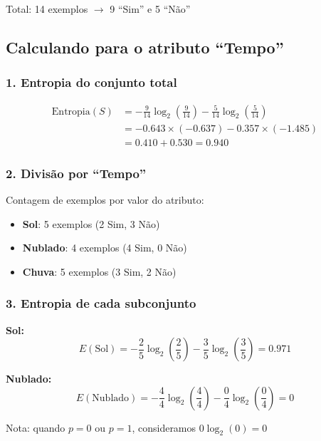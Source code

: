 \documentclass[12pt,a4paper]{article}
\begin{document}
Total: 14 exemplos $\rightarrow$ 9 ``Sim'' e 5 ``Não''

\subsection{Calculando para o atributo ``Tempo''}

\subsubsection{1. Entropia do conjunto total}

\begin{align}
\text{Entropia}(S) &= -\frac{9}{14}\log_2\left(\frac{9}{14}\right) - \frac{5}{14}\log_2\left(\frac{5}{14}\right) \\
&= -0.643 \times (-0.637) - 0.357 \times (-1.485) \\
&= 0.410 + 0.530 = 0.940
\end{align}

\subsubsection{2. Divisão por ``Tempo''}

Contagem de exemplos por valor do atributo:
\begin{itemize}
    \item \textbf{Sol}: 5 exemplos (2 Sim, 3 Não)
    \item \textbf{Nublado}: 4 exemplos (4 Sim, 0 Não)
    \item \textbf{Chuva}: 5 exemplos (3 Sim, 2 Não)
\end{itemize}

\subsubsection{3. Entropia de cada subconjunto}

\textbf{Sol:}
\begin{equation}
E(\text{Sol}) = -\frac{2}{5}\log_2\left(\frac{2}{5}\right) - \frac{3}{5}\log_2\left(\frac{3}{5}\right) = 0.971
\end{equation}

\textbf{Nublado:}
\begin{equation}
E(\text{Nublado}) = -\frac{4}{4}\log_2\left(\frac{4}{4}\right) - \frac{0}{4}\log_2\left(\frac{0}{4}\right) = 0
\end{equation}

Nota: quando $p=0$ ou $p=1$, consideramos $0\log_2(0) = 0$
\end{document}
